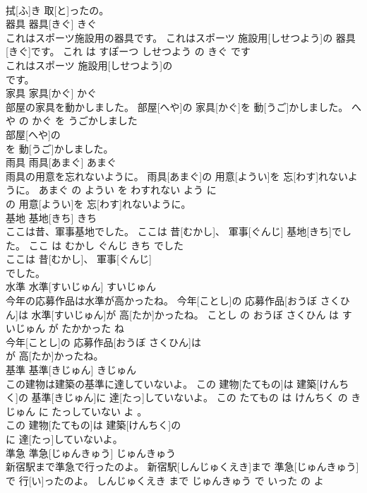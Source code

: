 \documentclass[8pt]{extreport}
\begin{document}
\begin{CJK}{UTF8}{min}
\\	拭[ふ]き 取[と]ったの。			
\\	器具	器具[きぐ]	きぐ	
\\	これはスポーツ施設用の器具です。	これはスポーツ 施設用[しせつよう]の 器具[きぐ]です。	これ は すぽーつ しせつよう の きぐ です	
\\	これはスポーツ 施設用[しせつよう]の
\\	です。			
\\	家具	家具[かぐ]	かぐ	
\\	部屋の家具を動かしました。	部屋[へや]の 家具[かぐ]を 動[うご]かしました。	へや の かぐ を うごかしました	
\\	部屋[へや]の
\\	を 動[うご]かしました。			
\\	雨具	雨具[あまぐ]	あまぐ	
\\	雨具の用意を忘れないように。	雨具[あまぐ]の 用意[ようい]を 忘[わす]れないように。	あまぐ の ようい を わすれない よう に	
\\	の 用意[ようい]を 忘[わす]れないように。			
\\	基地	基地[きち]	きち	
\\	ここは昔、軍事基地でした。	ここは 昔[むかし]、 軍事[ぐんじ] 基地[きち]でした。	ここ は むかし ぐんじ きち でした	
\\	ここは 昔[むかし]、 軍事[ぐんじ]
\\	でした。			
\\	水準	水準[すいじゅん]	すいじゅん	
\\	今年の応募作品は水準が高かったね。	今年[ことし]の 応募作品[おうぼ さくひん]は 水準[すいじゅん]が 高[たか]かったね。	ことし の おうぼ さくひん は すいじゅん が たかかった ね	
\\	今年[ことし]の 応募作品[おうぼ さくひん]は
\\	が 高[たか]かったね。			
\\	基準	基準[きじゅん]	きじゅん	
\\	この建物は建築の基準に達していないよ。	この 建物[たてもの]は 建築[けんちく]の 基準[きじゅん]に 達[たっ]していないよ。	この たてもの は けんちく の きじゅん に たっしていない よ 。	
\\	この 建物[たてもの]は 建築[けんちく]の
\\	に 達[たっ]していないよ。			
\\	準急	準急[じゅんきゅう]	じゅんきゅう	
\\	新宿駅まで準急で行ったのよ。	新宿駅[しんじゅくえき]まで 準急[じゅんきゅう]で 行[い]ったのよ。	しんじゅくえき まで じゅんきゅう で いった の よ	

\end{CJK}
\end{document}
